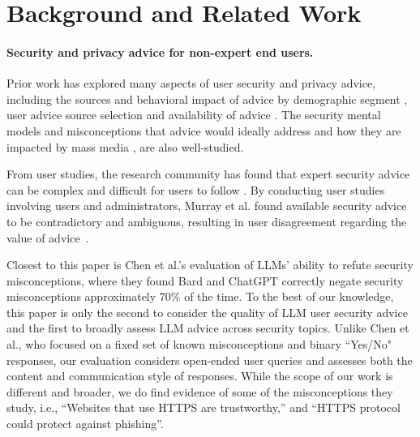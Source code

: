 \section{Background and Related Work}
\label{sec:background}

\paragraph{Security and privacy advice for non-expert end users.}
Prior work has explored many aspects of user security and privacy advice, including the sources and behavioral impact of advice by demographic segment \cite{redmiles-2016-sources-n-selection, redmiles-2016-learned-to-be-secure}, user advice source selection \cite{redmiles-2016-learned-to-be-secure, pfeffer-2022-replication-infomal-lessons, emilee-2012-informal-lessons} and availability of advice \cite{sruti-2022-ambiguous-sec-advice}. The security mental models and misconceptions that advice would ideally address \cite{nicholson-2018-cybersurvival, herbert2023world} and how they are impacted by mass media \cite{fulton-2019-media-effect}, are also well-studied.



From user studies, the research community has found that expert security advice can be complex and difficult for users to follow \cite{reeder-2017-152-steps, redmiles2020webadvice}.
By conducting user studies involving users and administrators, Murray et al. found available security advice to be contradictory and ambiguous, resulting in user disagreement regarding the value of advice~\cite{murray-2023-costbenefitsofadvice}.




Closest to this paper is Chen et al.'s \cite{chen2023can} evaluation of LLMs' ability to refute security misconceptions, where they found Bard and ChatGPT correctly negate security misconceptions approximately $70\%$ of the time. To the best of our knowledge, this paper is only the second to consider the quality of LLM user security advice and the first to broadly assess LLM advice across security topics. Unlike Chen et al., who focused on a fixed set of known misconceptions and binary “Yes/No" responses, our evaluation considers open-ended user queries and assesses both the content and communication style of responses. While the scope of our work is different and broader, we do find evidence of some of the misconceptions they study, i.e., ``Websites that use HTTPS are trustworthy,'' and “HTTPS protocol could protect against phishing”. %


